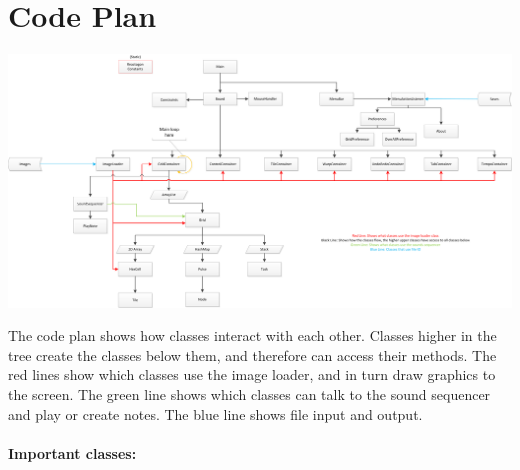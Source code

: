 \documentclass[10pt,a4paper]{article}
\begin{document}
\section{Code Plan}
\begin{center}
\includegraphics[scale=0.6, angle=270]{plan.png}
\end{center}
\pagebreak

The code plan shows how classes interact with each other. Classes higher in the tree create the classes below them, and therefore can access their methods. The red lines show which classes use the image loader, and in turn draw graphics to the screen. The green line shows which classes can talk to the sound sequencer and play or create notes. The blue line shows file input and output.\\
\\
\textbf{Important classes:}
\end{document}
